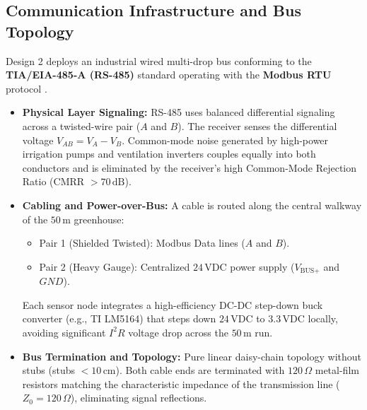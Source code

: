 \documentclass[12pt]{article}
\begin{document}
\subsection{Communication Infrastructure and Bus Topology}
Design 2 deploys an industrial wired multi-drop bus conforming to the \textbf{TIA/EIA-485-A (RS-485)} standard operating with the \textbf{Modbus RTU} protocol \cite{modbus_org}.
\begin{itemize}
    \item \textbf{Physical Layer Signaling:} RS-485 uses balanced differential signaling across a twisted-wire pair ($A$ and $B$). The receiver senses the differential voltage $V_{AB} = V_A - V_B$. Common-mode noise generated by high-power irrigation pumps and ventilation inverters couples equally into both conductors and is eliminated by the receiver's high Common-Mode Rejection Ratio (CMRR $> 70\,\text{dB}$).
    \item \textbf{Cabling and Power-over-Bus:} A cable is routed along the central walkway of the $50$\,m greenhouse:
    \begin{itemize}
        \item Pair 1 (Shielded Twisted): Modbus Data lines ($A$ and $B$).
        \item Pair 2 (Heavy Gauge): Centralized $24\,\text{VDC}$ power supply ($V_{\text{BUS}+}$ and $GND$).
    \end{itemize}
    Each sensor node integrates a high-efficiency DC-DC step-down buck converter (e.g., TI LM5164) that steps down $24\,\text{VDC}$ to $3.3\,\text{VDC}$ locally, avoiding significant $I^2R$ voltage drop across the $50$\,m run.
    \item \textbf{Bus Termination and Topology:} Pure linear daisy-chain topology without stubs (stubs $< 10\,\text{cm}$). Both cable ends are terminated with $120\,\Omega$ metal-film resistors matching the characteristic impedance of the transmission line ($Z_0 = 120\,\Omega$), eliminating signal reflections.
\end{itemize}
\end{document}
